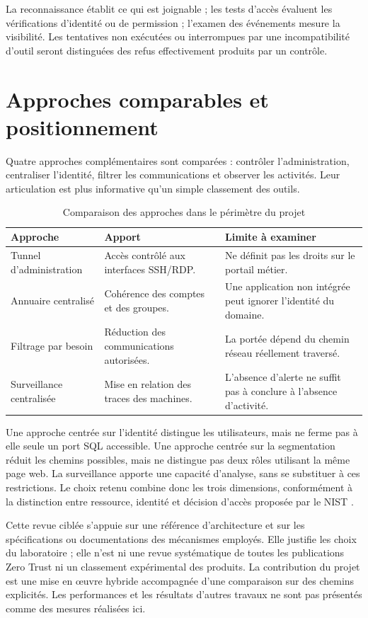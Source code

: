 \documentclass[a4paper,12pt]{report}
\begin{document}
La reconnaissance établit ce qui est joignable ; les tests d'accès évaluent les vérifications d'identité ou de permission ; l'examen des événements mesure la visibilité. Les tentatives non exécutées ou interrompues par une incompatibilité d'outil seront distinguées des refus effectivement produits par un contrôle.

\section{Approches comparables et positionnement}
Quatre approches complémentaires sont comparées : contrôler l'administration, centraliser l'identité, filtrer les communications et observer les activités. Leur articulation est plus informative qu'un simple classement des outils.

\begin{table}[H]\centering\small
\caption{Comparaison des approches dans le périmètre du projet}
\begin{tabularx}{\textwidth}{p{3cm}YY}\toprule
\textbf{Approche} & \textbf{Apport} & \textbf{Limite à examiner}\\\midrule
Tunnel d'administration & Accès contrôlé aux interfaces SSH/RDP. & Ne définit pas les droits sur le portail métier.\\
Annuaire centralisé & Cohérence des comptes et des groupes. & Une application non intégrée peut ignorer l'identité du domaine.\\
Filtrage par besoin & Réduction des communications autorisées. & La portée dépend du chemin réseau réellement traversé.\\
Surveillance centralisée & Mise en relation des traces des machines. & L'absence d'alerte ne suffit pas à conclure à l'absence d'activité.\\\bottomrule
\end{tabularx}\end{table}

Une approche centrée sur l'identité distingue les utilisateurs, mais ne ferme pas à elle seule un port SQL accessible. Une approche centrée sur la segmentation réduit les chemins possibles, mais ne distingue pas deux rôles utilisant la même page web. La surveillance apporte une capacité d'analyse, sans se substituer à ces restrictions. Le choix retenu combine donc les trois dimensions, conformément à la distinction entre ressource, identité et décision d'accès proposée par le NIST \cite{nist}.

Cette revue ciblée s'appuie sur une référence d'architecture et sur les spécifications ou documentations des mécanismes employés. Elle justifie les choix du laboratoire ; elle n'est ni une revue systématique de toutes les publications Zero Trust ni un classement expérimental des produits. La contribution du projet est une mise en œuvre hybride accompagnée d'une comparaison sur des chemins explicités. Les performances et les résultats d'autres travaux ne sont pas présentés comme des mesures réalisées ici.
\end{document}
